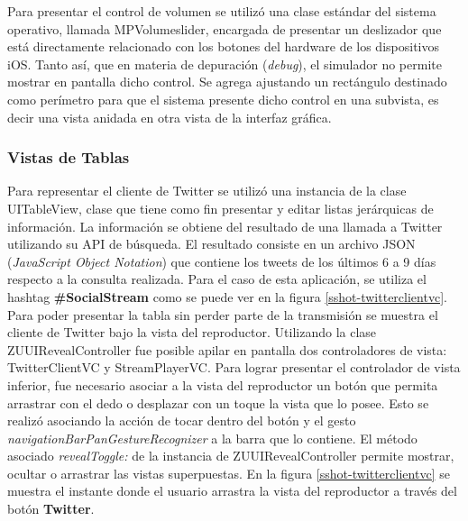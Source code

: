 		Para presentar el control de volumen se utilizó una clase estándar del sistema operativo, llamada MPVolumeslider, encargada de presentar un deslizador que está directamente relacionado con los botones del hardware de los dispositivos iOS. Tanto así, que en materia de depuración (\textit{debug}), el simulador no permite mostrar en pantalla dicho control. Se agrega ajustando un rectángulo destinado como perímetro para que el sistema presente dicho control en una subvista, es decir una vista anidada en otra vista de la interfaz gráfica.
		
		\subsubsection{Vistas de Tablas}
Para representar el cliente de Twitter se utilizó una instancia de la clase UITableView, clase que tiene como fin presentar y editar listas jerárquicas de información. La información se obtiene del resultado de una llamada a Twitter utilizando su API de búsqueda. El resultado consiste en un archivo JSON (\textit{JavaScript Object Notation}) que contiene los tweets de los últimos 6 a 9 días respecto a la consulta realizada. Para el caso de esta aplicación, se utiliza el hashtag \textbf{\#SocialStream} como se puede ver en la figura \ref{sshot-twitterclientvc}.\\

Para poder presentar la tabla sin perder parte de la transmisión se muestra el cliente de Twitter bajo la vista del reproductor. Utilizando la clase ZUUIRevealController fue posible apilar en pantalla dos controladores de vista: TwitterClientVC y StreamPlayerVC. Para lograr presentar el controlador de vista inferior, fue necesario asociar a la vista del reproductor un botón que permita arrastrar con el dedo o desplazar con un toque la vista que lo posee. Esto se realizó asociando la acción de tocar dentro del botón y el gesto \textit{navigationBarPanGestureRecognizer} a la barra que lo contiene. El método asociado \textit{revealToggle:} de la instancia de ZUUIRevealController permite mostrar, ocultar o arrastrar las vistas superpuestas. En la figura \ref{sshot-twitterclientvc} se muestra el instante donde el usuario arrastra la vista del reproductor a través del botón \textbf{Twitter}.


